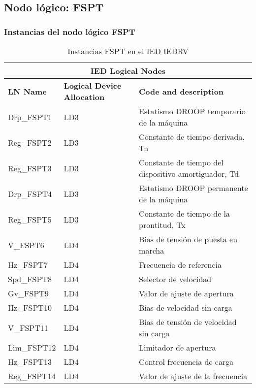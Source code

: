 
\subsection{Nodo l\'ogico: 			 FSPT}

    \subsubsection{Instancias del nodo l\'ogico FSPT}
    \begin{table}[H]
    \begin{center}
    \begin{tabular}{|l|l|p{6.8cm}|}
            \hline
            \multicolumn{3}{|c|}{\cellcolor[gray]{0.8} \textbf{IED Logical Nodes} } \\
            \hline
            \textbf{LN Name} & \textbf{Logical Device Allocation} & \textbf{Code and description} \\
            \hline
            Drp\_FSPT1 & LD3 & Estatismo DROOP temporario de la m\'aquina \\
            \hline
            Reg\_FSPT2 & LD3 & Constante de tiempo derivada, Tn \\
            \hline
            Reg\_FSPT3 & LD3 & Constante de tiempo del dispositivo amortiguador, Td \\
            \hline
            Drp\_FSPT4 & LD3 & Estatismo DROOP permanente de la m\'aquina \\
            \hline
            Reg\_FSPT5 & LD3 & Constante de tiempo de la prontitud, Tx \\
            \hline
            V\_FSPT6 & LD4 & Bias de tensi\'on de puesta en marcha \\
            \hline
            Hz\_FSPT7 & LD4 & Frecuencia de referencia \\
            \hline
            Spd\_FSPT8 & LD4 & Selector de velocidad \\
            \hline
            Gv\_FSPT9 & LD4 & Valor de ajuste de apertura \\
            \hline
            Hz\_FSPT10 & LD4 & Bias de velocidad sin carga \\
            \hline
            V\_FSPT11 & LD4 & Bias de tensi\'on de velocidad sin carga \\
            \hline
            Lim\_FSPT12 & LD4 & Limitador de apertura \\
            \hline
            Hz\_FSPT13 & LD4 & Control frecuencia de carga \\
            \hline
            Reg\_FSPT14 & LD4 & Valor de ajuste de la frecuencia \\
            \hline
    \end{tabular}
    \caption{Instancias FSPT en el IED IEDRV}
    \label{table:lnInstFSPT_1}
    \end{center}
    \end{table}
    
